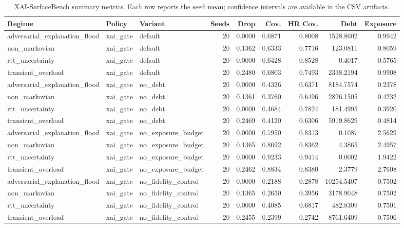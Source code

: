 \begin{table}[t]
\centering
\scriptsize
\caption{XAI-SurfaceBench summary metrics. Each row reports the seed mean; confidence intervals are available in the CSV artifacts.}
\begin{tabular}{lllrrrrrr}
\toprule
Regime & Policy & Variant & Seeds & Drop & Cov. & HR Cov. & Debt & Exposure \\
\midrule
adversarial\_explanation\_flood & xai\_gate & default & 20 & 0.0000 & 0.6871 & 0.8008 & 1528.8602 & 0.9942 \\
non\_markovian & xai\_gate & default & 20 & 0.1362 & 0.6333 & 0.7716 & 123.0811 & 0.8059 \\
rtt\_uncertainty & xai\_gate & default & 20 & 0.0000 & 0.6428 & 0.8528 & 0.4017 & 0.5765 \\
transient\_overload & xai\_gate & default & 20 & 0.2480 & 0.6803 & 0.7493 & 2338.2194 & 0.9908 \\
adversarial\_explanation\_flood & xai\_gate & no\_debt & 20 & 0.0000 & 0.4326 & 0.6371 & 8184.7574 & 0.2378 \\
non\_markovian & xai\_gate & no\_debt & 20 & 0.1361 & 0.3760 & 0.6496 & 2826.1505 & 0.4232 \\
rtt\_uncertainty & xai\_gate & no\_debt & 20 & 0.0000 & 0.4684 & 0.7824 & 181.4995 & 0.3920 \\
transient\_overload & xai\_gate & no\_debt & 20 & 0.2469 & 0.4120 & 0.6306 & 5919.8629 & 0.4814 \\
adversarial\_explanation\_flood & xai\_gate & no\_exposure\_budget & 20 & 0.0000 & 0.7950 & 0.8313 & 0.1087 & 2.5629 \\
non\_markovian & xai\_gate & no\_exposure\_budget & 20 & 0.1365 & 0.8692 & 0.8362 & 4.3865 & 2.4957 \\
rtt\_uncertainty & xai\_gate & no\_exposure\_budget & 20 & 0.0000 & 0.9233 & 0.9414 & 0.0002 & 1.9422 \\
transient\_overload & xai\_gate & no\_exposure\_budget & 20 & 0.2462 & 0.8834 & 0.8380 & 2.3779 & 2.7608 \\
adversarial\_explanation\_flood & xai\_gate & no\_fidelity\_control & 20 & 0.0000 & 0.2188 & 0.2878 & 10254.5407 & 0.7502 \\
non\_markovian & xai\_gate & no\_fidelity\_control & 20 & 0.1365 & 0.2650 & 0.3956 & 3178.9048 & 0.7502 \\
rtt\_uncertainty & xai\_gate & no\_fidelity\_control & 20 & 0.0000 & 0.4085 & 0.6817 & 482.8309 & 0.7501 \\
transient\_overload & xai\_gate & no\_fidelity\_control & 20 & 0.2455 & 0.2399 & 0.2742 & 8761.6409 & 0.7506 \\

\end{tabular}
\end{table}
